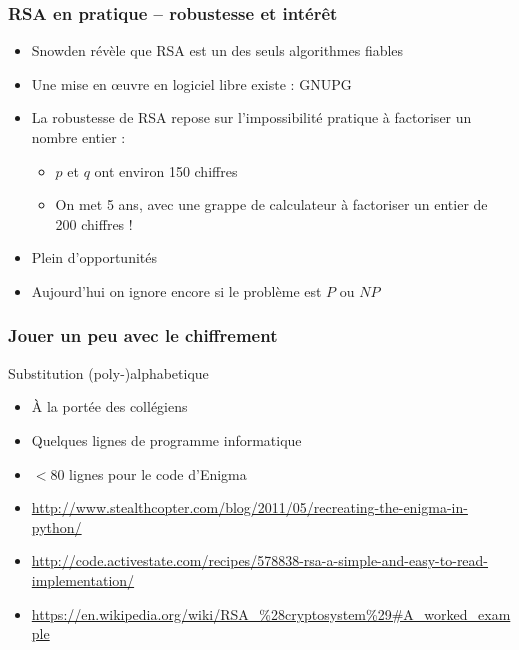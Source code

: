 \documentclass[french]{beamer}
\begin{document}
\begin{frame}
  \frametitle{RSA en pratique -- robustesse et intérêt}
  \begin{itemize}
    \item Snowden révèle que RSA est un des seuls algorithmes fiables
    \item Une mise en œuvre en logiciel libre existe : GNUPG
    \item La robustesse de RSA repose sur l'impossibilité pratique à
      factoriser un nombre entier :
      \begin{itemize}
        \item $p$ et $q$ ont environ 150 chiffres
        \item On met 5 ans, avec une grappe de calculateur à factoriser
          un entier de 200 chiffres !
      \end{itemize}
    \item Plein d'opportunités
    \item Aujourd'hui on ignore encore si le problème est $P$ ou $NP$
  \end{itemize}
\end{frame}

\begin{frame}
  \frametitle{Jouer un peu avec le chiffrement}
  \begin{block}{Substitution (poly-)alphabetique}
    \begin{itemize}
      \item À la portée des collégiens
      \item Quelques lignes de programme informatique
      \item $<80$ lignes pour le code d'Enigma
      \item
        \url{http://www.stealthcopter.com/blog/2011/05/recreating-the-enigma-in-python/}
      \item
        \url{http://code.activestate.com/recipes/578838-rsa-a-simple-and-easy-to-read-implementation/}
      \item
        \url{https://en.wikipedia.org/wiki/RSA_\%28cryptosystem\%29\#A_worked_example}
    \end{itemize}
  \end{block}
\end{frame}

\end{document}
